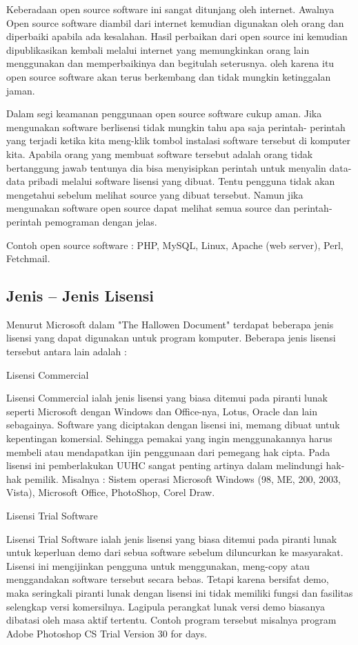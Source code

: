 \documentclass[../wastek.tex]{subfiles}
\begin{document}
Keberadaan open source software ini sangat ditunjang oleh internet. Awalnya Open source software diambil dari internet kemudian digunakan oleh orang dan diperbaiki apabila ada kesalahan. Hasil perbaikan dari open source ini kemudian dipublikasikan kembali melalui internet yang memungkinkan orang lain menggunakan dan memperbaikinya dan begitulah seterusnya. oleh karena itu open source software akan terus berkembang dan tidak mungkin ketinggalan jaman.

Dalam segi keamanan penggunaan open source software cukup aman. Jika mengunakan software berlisensi tidak mungkin tahu apa saja perintah- perintah yang terjadi ketika kita meng-klik tombol instalasi software tersebut di komputer kita. Apabila orang yang membuat software tersebut adalah orang tidak bertanggung jawab tentunya dia bisa menyisipkan perintah untuk menyalin data-data pribadi melalui software lisensi yang dibuat. Tentu pengguna tidak akan mengetahui sebelum melihat source yang dibuat tersebut. Namun jika mengunakan software open source dapat melihat semua source dan perintah-perintah pemograman dengan jelas.

Contoh open source software : PHP, MySQL, Linux, Apache (web server), Perl, Fetchmail.

\subsection{Jenis – Jenis Lisensi}%
\label{sub:jenis_–_jenis_lisensi}


Menurut Microsoft dalam "The Hallowen Document" terdapat beberapa jenis lisensi yang dapat digunakan untuk program komputer. Beberapa jenis lisensi tersebut antara lain adalah :

\tabitem Lisensi Commercial

Lisensi Commercial ialah jenis lisensi yang biasa ditemui pada piranti lunak seperti Microsoft dengan Windows dan Office-nya, Lotus, Oracle dan lain sebagainya. Software yang diciptakan dengan lisensi ini, memang dibuat untuk	kepentingan	komersial. Sehingga  pemakai  yang  ingin menggunakannya harus membeli atau mendapatkan ijin penggunaan dari pemegang hak cipta. Pada lisensi ini pemberlakukan UUHC sangat penting artinya dalam melindungi hak-hak pemilik. Misalnya : Sistem operasi Microsoft Windows (98, ME, 200, 2003, Vista), Microsoft Office, PhotoShop, Corel Draw.

\tabitem Lisensi Trial Software

Lisensi Trial Software ialah jenis lisensi yang biasa ditemui pada piranti lunak untuk keperluan demo dari sebua software sebelum diluncurkan ke masyarakat. Lisensi ini mengijinkan pengguna   untuk   menggunakan, meng-copy atau menggandakan software tersebut secara bebas. Tetapi karena bersifat demo, maka seringkali piranti lunak dengan lisensi ini tidak memiliki fungsi dan  fasilitas  selengkap  versi  komersilnya.  Lagipula perangkat lunak versi demo biasanya dibatasi oleh masa aktif tertentu. Contoh program tersebut misalnya program Adobe Photoshop CS Trial Version 30 for days.
\end{document}
